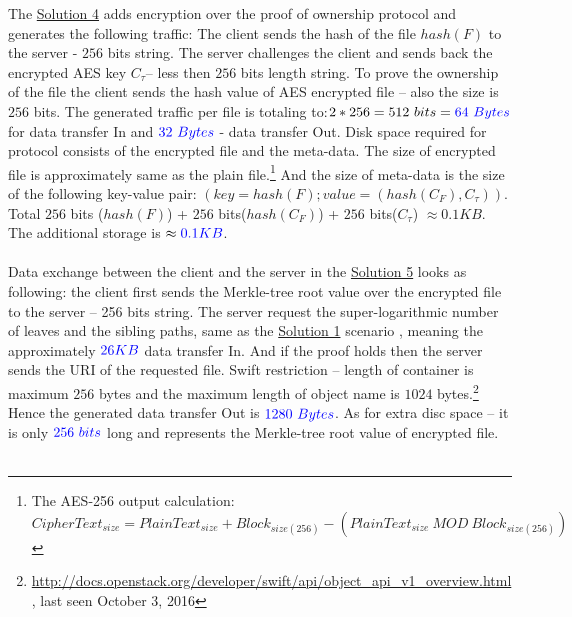 \documentclass[12pt]{article}
\begin{document}
The \hyperref[sub:Soltuion4]{Solution 4} adds encryption over the proof of ownership protocol and generates the following traffic: The client sends the hash of the file $hash(F)$ to the server - $256$ bits string. The server challenges the client and sends back the encrypted AES key $C_\tau$-- less then $256$  bits length string. To prove the ownership of the file the client  sends the hash value of AES encrypted file -- also the size is $256$  bits. The generated traffic per file is totaling to:$2*256=512\ bits=\color{blue}64\ Bytes$ for data transfer In and $\color{blue}32\ Bytes$ - data transfer Out. Disk space required for protocol consists of the encrypted file and the meta-data. The size of encrypted file is approximately same as the plain file.\footnote{The AES-256 output calculation: $CipherText_{size} = PlainText_{size} + Block_{size(256)} - (PlainText_{size}\ MOD\ Block_{size(256)})$}  And the size of meta-data is the size of the following key-value pair: $(key = hash(F); value = (hash(C_F), C_\tau))$. Total  $256$ bits ($hash(F)$) + $256$ bits($hash(C_F)$) + $256$ bits($C_\tau$) $\approx0.1KB$. The additional storage is $\approx\color{blue}0.1KB$.\\\\
Data exchange between the client and the server in the \hyperref[sub:Soltuion5]{Solution 5} looks as  following: the client first sends the Merkle-tree root value over the encrypted file to the server  -- 256 bits string. The server request the super-logarithmic number of leaves and the sibling paths, same as the \hyperref[sub:Soltuion1]{Solution 1} scenario , meaning the  approximately $\color{blue}26KB$ data transfer In. And if the proof holds then the server sends the URI of the requested file. Swift restriction -- length of container is maximum $256$ bytes and the maximum length of object name is $1024$ bytes.\footnote{\url{http://docs.openstack.org/developer/swift/api/object_api_v1_overview.html}, last seen October 3, 2016} Hence the generated data transfer Out is $\color{blue} 1280\ Bytes$. As for extra disc space -- it is only $\color{blue}256\ bits$  long and represents the Merkle-tree root value of encrypted file.\\\\
\end{document}
